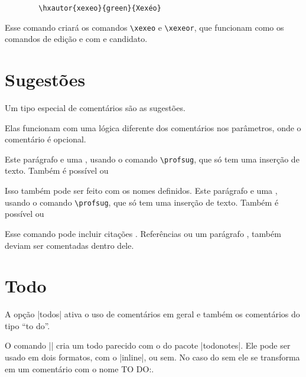 \documentclass{article}
\begin{document}
    \begin{verbatim}
        \hxautor{xexeo}{green}{Xexéo}
    \end{verbatim}
    
    Esse comando criará os comandos \verb!\xexeo! e \verb!\xexeor!, que funcionam como os comandos de edição  e com  e candidato.
    
\section{Sugestões}

Um tipo especial de comentários são as sugestões.

Elas funcionam com uma lógica diferente dos comentários nos parâmetros, onde o comentário é opcional.

Este parágrafo  e 
uma , usando o comando \verb*|\profsug|, que só tem uma inserção de texto. Também é possível  ou 

Isso também pode ser feito com os nomes definidos. 
Este parágrafo  e 
uma , usando o comando \verb*|\profsug|, que só tem uma inserção de texto. Também é possível  ou 

Esse comando pode incluir citações . 
Referências %
ou um parágrafo 
\xexeorem{\ref{sug:com1}}, também deviam ser comentadas dentro dele.


    \section{Todo}
    
    A opção |todos| ativa o uso de comentários em geral e também os comentários do tipo ``to do''.
    
    O comando || cria um todo parecido com o do pacote |todonotes|.
    Ele pode ser usado em dois formatos, com o |inline|, ou sem. No caso do sem ele se transforma em um comentário com o nome TO DO:.
\end{document}
